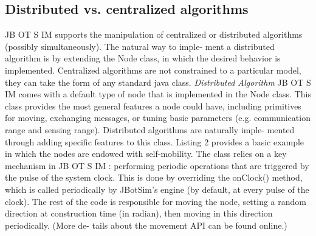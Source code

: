 \subsection{Distributed vs. centralized algorithms}
JB OT S IM supports the manipulation of centralized or distributed
algorithms (possibly simultaneously). The natural way to imple-
ment a distributed algorithm is by extending the Node class, in
which the desired behavior is implemented. Centralized algorithms
are not constrained to a particular model, they can take the form of
any standard java class.
\textit{Distributed Algorithm}
JB OT S IM comes with a default type of node that is implemented
in the Node class. This class provides the most general features
a node could have, including primitives for moving, exchanging
messages, or tuning basic parameters (e.g. communication range
and sensing range). Distributed algorithms are naturally imple-
mented through adding specific features to this class. Listing 2
provides a basic example in which the nodes are endowed with
self-mobility. The class relies on a key mechanism in JB OT S IM :
performing periodic operations that are triggered by the pulse of the
system clock. This is done by overriding the onClock() method,
which is called periodically by JBotSim’s engine (by default, at
every pulse of the clock). The rest of the code is responsible for
moving the node, setting a random direction at construction time
(in radian), then moving in this direction periodically. (More de-
tails about the movement API can be found online.)
